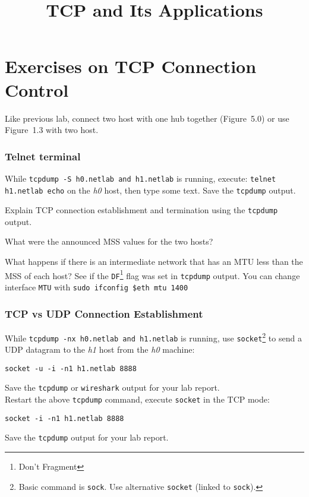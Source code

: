 \documentclass{../UTNetLab}
\title{TCP and Its Applications}
\begin{document}
\part{Exercises on TCP Connection Control}
    Like previous lab, connect two host with one hub together (Figure~5.0) or use Figure~1.3 with two host.

\section{Telnet terminal}
    While \lstinline[emph={h0,h1,netlab}]{tcpdump -S h0.netlab and h1.netlab} is running, execute: \lstinline[emph={h0,h1,netlab}]{telnet h1.netlab echo} on the \textit{h0} host, then type some text.
    Save the \lstinline{tcpdump} output.
    
    \begin{report}
        \item Explain TCP connection establishment and termination using the \lstinline{tcpdump} output.
        
        \item What were the announced MSS values for the two hosts?
        
        \item What happens if there is an intermediate network that has an MTU less than the MSS of each host?
    See if the \texttt{DF}\footnote{Don't Fragment} flag was set in \lstinline{tcpdump} output.
    You can change interface \texttt{MTU} with \lstinline[emph=$eth]{sudo ifconfig $eth mtu 1400}
    \end{report}
    
\section{TCP vs UDP Connection Establishment}
    While \lstinline[emph={h0,h1,netlab}]{tcpdump -nx h0.netlab and h1.netlab} is running, use \lstinline{socket}\footnote{Basic command is \lstinline{sock}. Use alternative \lstinline{socket} (linked to \lstinline{sock}).} to send a UDP datagram to the \textit{h1} host from the \textit{h0} machine:
    \begin{lstlisting}[emph={h0,h1,netlab}]
socket -u -i -n1 h1.netlab 8888
    \end{lstlisting}
    {Save} the \lstinline{tcpdump} or \lstinline{wireshark} output for your lab report. \\
    Restart the above \lstinline{tcpdump} command, execute \lstinline{socket} in the TCP mode:
    \begin{lstlisting}[emph={h1,netlab}]
socket -i -n1 h1.netlab 8888
    \end{lstlisting}
    {Save} the \lstinline{tcpdump} output for your lab report.
    
\end{document}
